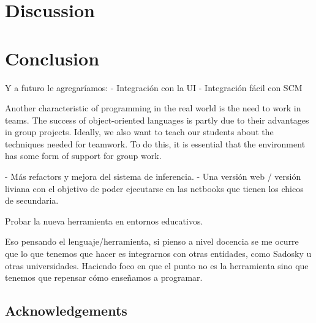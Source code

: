 \documentclass[preprint,10pt]{sigplanconf}
\begin{document}



\section{Discussion}
\label{sec:discussion}





\section{Conclusion}
\label{sec:conclusion}



Y a futuro le agregaríamos:
- Integración con la UI
- Integración fácil con SCM

Another characteristic of programming in the real world is the need to work in
teams. The success of object-oriented languages is partly due to their advantages in
group projects. Ideally, we also want to teach our students about the techniques
needed for teamwork. To do this, it is essential that the environment has some form
of support for group work. \cite{kolling_problem_1999}

- Más refactors y mejora del sistema de inferencia.
- Una versión web / versión liviana con el objetivo de poder ejecutarse en las netbooks que tienen los chicos de secundaria.

Probar la nueva herramienta en entornos educativos.

Eso pensando el lenguaje/herramienta, si pienso a nivel docencia se me ocurre que lo que tenemos que hacer es integrarnos con otras entidades, como Sadosky u otras universidades.
Haciendo foco en que el punto no es la herramienta sino que tenemos que repensar cómo enseñamos a programar.

\subsection*{Acknowledgements} 
\end{document}
